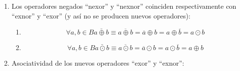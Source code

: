 \begin{enumerate}
\begin{enumerate}
\begin{enumerate}
\begin{enumerate}
        Prueba:

        \[a \oplus {{{b = {{({\overline{a} \cdot b})} + {({a \cdot \overline{b}})}}} = {{\lbrack{{({\overline{a} \cdot b})} + a}\rbrack} \cdot {\lbrack{{({\overline{a} \cdot b})} + \overline{b}}\rbrack}}} = {{\lbrack{a + b}\rbrack} \cdot {\lbrack{\overline{a} + \overline{b}}\rbrack}}}\]

        \[\overline{a} \oplus {{{{\overline{b} = {{\lbrack{\overline{a} + \overline{b}}\rbrack} \cdot {\lbrack{\overline{\overline{a}} + \overline{\overline{b}}}\rbrack}}} = {{\lbrack{\overline{a} + \overline{b}}\rbrack} \cdot {\lbrack{a + b}\rbrack}}} = {{\lbrack{a + b}\rbrack} \cdot {\lbrack{\overline{a} + \overline{b}}\rbrack}}} = a} \oplus b\]
      \item
        \[\forall a,{b \in B}a \odot {b = \bar{a}} \odot \bar{b}\]

        Prueba:

        \[a \odot {{{b = {{({\overline{a} + b})} \cdot {({a + \overline{b}})}}} = {{\lbrack{{({\overline{a} + b})} \cdot a}\rbrack} + {\lbrack{{({\overline{a} + b})} \cdot \overline{b}}\rbrack}}} = {{\lbrack{a \cdot b}\rbrack} + {\lbrack{\overline{a} \cdot \overline{b}}\rbrack}}}\]

        \[\overline{a} \odot {{{{\overline{b} = {{\lbrack{\overline{a} \cdot \overline{b}}\rbrack} + {\lbrack{\overline{\overline{a}} \cdot \overline{\overline{b}}}\rbrack}}} = {{\lbrack{\overline{a} \cdot \overline{b}}\rbrack} + {\lbrack{a \cdot b}\rbrack}}} = {{\lbrack{a \cdot b}\rbrack} + {\lbrack{\overline{a} \cdot \overline{b}}\rbrack}}} = a} \odot b\]
      \end{enumerate}
    \item
      Los operadores negados ``nexor'' y ``nexnor'' coinciden
      respectivamente con ``exnor'' y ``exor'' (y así no se producen
      nuevos operadores):

      \begin{enumerate}
      \def\labelenumiv{\arabic{enumiv}.}
      \tightlist
      \item
        \[\forall a,{b \in B}{{\bar{a\oplus b} \equiv \overline{a\oplus b}} = \overline{a}} \oplus {b = a} \oplus {\overline{b} = a} \odot b\]
      \item
        \[\forall a,{b \in B}{{\bar{a\odot b} \equiv \overline{a\odot b}} = \overline{a}} \odot {b = a} \odot {\overline{b} = a} \oplus b\]
      \end{enumerate}
    \item
      Asociatividad de los nuevos operadores ``exor'' y ``exnor'':


\end{enumerate}
\end{enumerate}
\end{enumerate}
